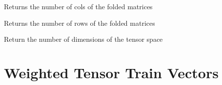 \documentclass[a4paper,10pt,english]{sphinxmanual}
\begin{document}
\begin{fulllineitems}
\begin{fulllineitems}
\end{fulllineitems}


\begin{fulllineitems}
\label{api-qttmat:TensorToolbox.core.QTTmat.get_ncols}
Returns the number of cols of the folded matrices

\end{fulllineitems}


\begin{fulllineitems}
\label{api-qttmat:TensorToolbox.core.QTTmat.get_nrows}
Returns the number of rows of the folded matrices

\end{fulllineitems}


\begin{fulllineitems}
\label{api-qttmat:TensorToolbox.core.QTTmat.ndims}
Return the number of dimensions of the tensor space

\end{fulllineitems}


\end{fulllineitems}



\section{Weighted Tensor Train Vectors}
\label{api-wttvec:weighted-tensor-train-vectors}\label{api-wttvec::doc}\label{api-wttvec:module-TensorToolbox}
\end{document}
